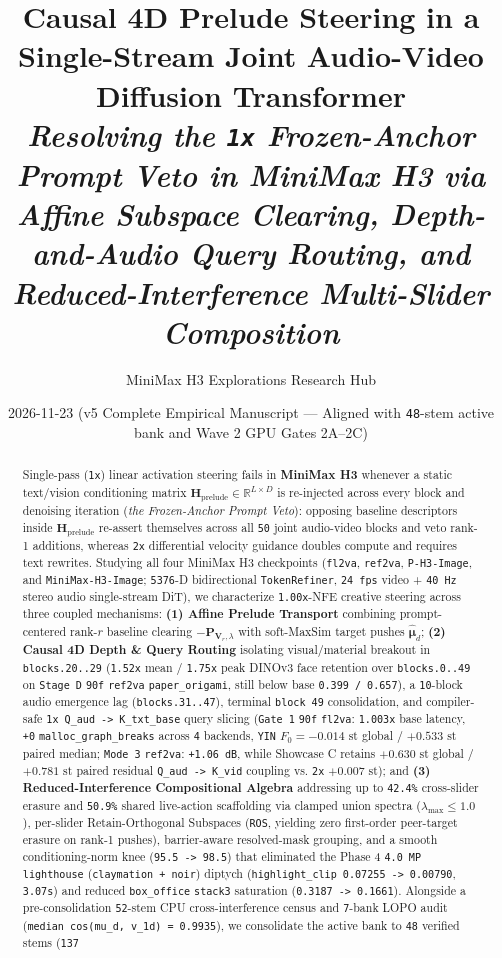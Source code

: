 \documentclass[10pt]{article}
\title{\textbf{Causal 4D Prelude Steering in a Single-Stream Joint Audio-Video Diffusion Transformer \\ \vspace{4pt} \large\emph{Resolving the \texttt{1x} Frozen-Anchor Prompt Veto in MiniMax H3 via Affine Subspace Clearing, Depth-and-Audio Query Routing, and Reduced-Interference Multi-Slider Composition}}}
\author{MiniMax H3 Explorations Research Hub}
\date{2026-11-23 (v5 Complete Empirical Manuscript --- Aligned with \texttt{48}-stem active bank and Wave 2 GPU Gates 2A--2C)}
\begin{document}
\maketitle



\begin{abstract}

Single-pass (\texttt{1x}) linear activation steering fails in \textbf{MiniMax H3} whenever a static text/vision conditioning matrix $\mathbf{H}_{\text{prelude}} \in \mathbb{R}^{L \times D}$ is re-injected across every block and denoising iteration (\emph{the Frozen-Anchor Prompt Veto}): opposing baseline descriptors inside $\mathbf{H}_{\text{prelude}}$ re-assert themselves across all \texttt{50} joint audio-video blocks and veto rank-1 additions, whereas \texttt{2x} differential velocity guidance doubles compute and requires text rewrites. Studying all four MiniMax H3 checkpoints (\texttt{fl2va}, \texttt{ref2va}, \texttt{P-H3-Image}, and \texttt{MiniMax-H3-Image}; \texttt{5376}-D bidirectional \texttt{TokenRefiner}, \texttt{24 fps} video + \texttt{40 Hz} stereo audio single-stream DiT), we characterize \texttt{1.00x}-NFE creative steering across three coupled mechanisms: \textbf{(1) Affine Prelude Transport} combining prompt-centered rank-$r$ baseline clearing $-\mathbf{P}_{\mathbf{V}_r,\lambda}$ with soft-MaxSim target pushes $\hat{\boldsymbol{\mu}}_d$; \textbf{(2) Causal 4D Depth \& Query Routing} isolating visual/material breakout in \texttt{blocks.20..29} (\texttt{1.52x} mean / \texttt{1.75x} peak DINOv3 face retention over \texttt{blocks.0..49} on \texttt{Stage D} \texttt{90f} \texttt{ref2va} \texttt{paper\_origami}, still below base \texttt{0.399 / 0.657}), a \texttt{10}-block audio emergence lag (\texttt{blocks.31..47}), terminal \texttt{block 49} consolidation, and compiler-safe \texttt{1x Q\_aud -> K\_txt\_base} query slicing (\texttt{Gate 1} \texttt{90f} \texttt{fl2va}: \texttt{1.003x} base latency, \texttt{+0} \texttt{malloc\_graph\_breaks} across \texttt{4} backends, \texttt{YIN} $F_0 = -0.014\text{ st}$ global / $+0.533\text{ st}$ paired median; \texttt{Mode 3} \texttt{ref2va}: \texttt{+1.06 dB}, while Showcase C retains $+0.630\text{ st}$ global / $+0.781\text{ st}$ paired residual \texttt{Q\_aud -> K\_vid} coupling vs. \texttt{2x} $+0.007\text{ st}$); and \textbf{(3) Reduced-Interference Compositional Algebra} addressing up to \texttt{42.4\%} cross-slider erasure and \texttt{50.9\%} shared live-action scaffolding via clamped union spectra ($\lambda_{\max} \le 1.0$), per-slider Retain-Orthogonal Subspaces (\texttt{ROS}, yielding zero first-order peer-target erasure on rank-1 pushes), barrier-aware resolved-mask grouping, and a smooth conditioning-norm knee (\texttt{95.5 -> 98.5}) that eliminated the Phase 4 \texttt{4.0 MP} \texttt{lighthouse} (\texttt{claymation + noir}) diptych (\texttt{highlight\_clip 0.07255 -> 0.00790}, \texttt{3.07s}) and reduced \texttt{box\_office} \texttt{stack3} saturation (\texttt{0.3187 -> 0.1661}). Alongside a pre-consolidation \texttt{52}-stem CPU cross-interference census and \texttt{7}-bank LOPO audit (\texttt{median cos(mu\_d, v\_1d) = 0.9935}), we consolidate the active bank to \texttt{48} verified stems (\texttt{137} 
\end{abstract}
\end{document}
